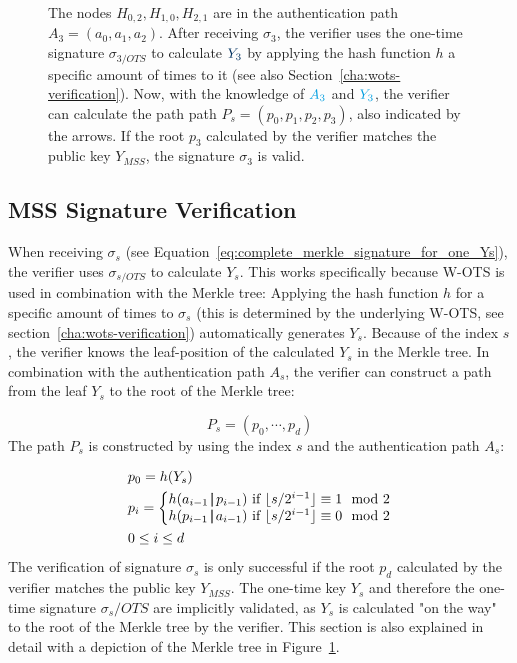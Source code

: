\begin{figure}
{The nodes $H_{0,2}, H_{1,0}, H_{2,1}$ are in the \textcolor{cyan_tud}{authentication path $A_3 = (a_0, a_1, a_2)$}. After receiving $\sigma_3$, the verifier uses the one-time signature \textcolor{cyan_tud}{$\sigma_{3/OTS}$} to calculate $\textcolor{darkblue_tud}{Y_3}$ by applying the hash function $h$ a specific amount of times to it (see also Section~\ref{cha:wots-verification}).
Now, with the knowledge of $\textcolor{cyan_tud}{A_3}$ and $\textcolor{cyan_tud}{Y_3}$, the verifier can calculate the path \textcolor{darkblue_tud}{path $P_s = (p_0, p_1, p_2, p_3)$}, also indicated by the arrows. If the root $p_3$ calculated by the verifier matches the public key $Y_{MSS}$, the signature $\sigma_3$ is valid.}
\label{img:merkle_tree_signature_gen}
\end{figure}



\subsection{MSS Signature Verification}
When receiving $\sigma_s$ (see Equation~\ref{eq:complete_merkle_signature_for_one_Ys}), the verifier uses $\sigma_{s/OTS}$ to calculate $Y_s$. This works specifically because W-OTS is used in combination with the Merkle tree: Applying the hash function $h$ for a specific amount of times to $\sigma_s$ (this is determined by the underlying W-OTS, see section~\ref{cha:wots-verification}) automatically generates $Y_s$.
Because of the index $s$, the verifier knows the leaf-position of the calculated $Y_s$ in the Merkle tree. 
In combination with the authentication path $A_s$, the verifier can construct a path from the leaf $Y_s$ to the root of the Merkle tree: 

\begin{equation}
P_s = (p_0, \cdots, p_d)
\end{equation}
The path $P_s$ is constructed by using the index $s$ and the authentication path $A_s$:

\begin{align}
\label{eq:merkle_verifier_path_calculation}
&p_0 = h(Y_s) \\
&p_{i} = 
\left\{\begin{matrix} \nonumber
h(a_{i-1} \operatorname{|\!\!|} p_{i-1}) \text{ if } \lfloor s/2^{i-1}\rfloor \equiv 1 \mod{2} \\
h(p_{i-1} \operatorname{|\!\!|} a_{i-1}) \text{ if } \lfloor s/2^{i-1}\rfloor \equiv 0 \mod{2}
\end{matrix}\right.  \nonumber \\
&0 \leq i \leq d  \nonumber 
\end{align}
The verification of signature $\sigma_s$ is only successful if the root $p_d$ calculated by the verifier matches the public key $Y_{MSS}$. The one-time key $Y_s$ and therefore the one-time signature $\sigma_s/OTS$ are implicitly validated, as $Y_s$ is calculated "on the way" to the root of the Merkle tree by the verifier.
This section is also explained in detail with a depiction of the Merkle tree in Figure~\ref{img:merkle_tree_signature_gen}.

